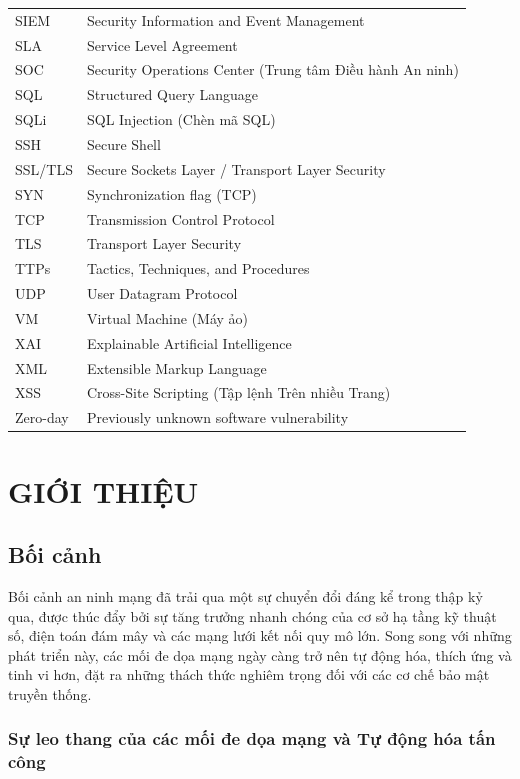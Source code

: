 \documentclass[12pt,a4paper,twoside]{report}
\begin{document}
\begin{longtable}[c]{p{3cm}p{12cm}}
SIEM & Security Information and Event Management \\
SLA & Service Level Agreement \\
SOC & Security Operations Center (Trung tâm Điều hành An ninh) \\
SQL & Structured Query Language \\
SQLi & SQL Injection (Chèn mã SQL) \\
SSH & Secure Shell \\
SSL/TLS & Secure Sockets Layer / Transport Layer Security \\
SYN & Synchronization flag (TCP) \\
TCP & Transmission Control Protocol \\
TLS & Transport Layer Security \\
TTPs & Tactics, Techniques, and Procedures \\
UDP & User Datagram Protocol \\
VM & Virtual Machine (Máy ảo) \\
XAI & Explainable Artificial Intelligence \\
XML & Extensible Markup Language \\
XSS & Cross-Site Scripting (Tập lệnh Trên nhiều Trang) \\
Zero-day & Previously unknown software vulnerability \\
\bottomrule
\end{longtable}

\newpage

\chapter{GIỚI THIỆU}

\section{Bối cảnh}

Bối cảnh an ninh mạng đã trải qua một sự chuyển đổi đáng kể trong thập kỷ qua, được thúc đẩy bởi sự tăng trưởng nhanh chóng của cơ sở hạ tầng kỹ thuật số, điện toán đám mây và các mạng lưới kết nối quy mô lớn. Song song với những phát triển này, các mối đe dọa mạng ngày càng trở nên tự động hóa, thích ứng và tinh vi hơn, đặt ra những thách thức nghiêm trọng đối với các cơ chế bảo mật truyền thống.

\subsection{Sự leo thang của các mối đe dọa mạng và Tự động hóa tấn công}
\end{document}
